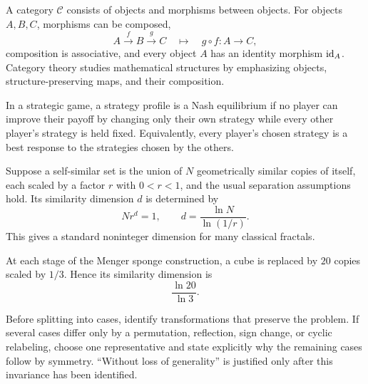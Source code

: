     \relatedbooks{}

    \begin{definition}[Category]
        A category $\mathcal{C}$ consists of objects and morphisms between
        objects. For objects $A,B,C$, morphisms can be composed,
        \[
            A\xrightarrow{f}B\xrightarrow{g}C
            \quad\longmapsto\quad
            g\circ f:A\to C,
        \]
        composition is associative, and every object $A$ has an identity
        morphism $\operatorname{id}_A$. Category theory studies mathematical structures by
        emphasizing objects, structure-preserving maps, and their composition.
    \end{definition}

    \begin{definition}
        In a strategic game, a strategy profile is a Nash equilibrium if no
        player can improve their payoff by changing only their own strategy
        while every other player's strategy is held fixed. Equivalently, every
        player's chosen strategy is a best response to the strategies chosen by
        the others.
    \end{definition}

    \begin{definition}
        Suppose a self-similar set is the union of $N$ geometrically similar
        copies of itself, each scaled by a factor $r$ with $0<r<1$, and the
        usual separation assumptions hold. Its similarity dimension $d$ is
        determined by
        \[
            Nr^d=1,
            \qquad
            d=\frac{\ln N}{\ln(1/r)}.
        \]
        This gives a standard noninteger dimension for many classical fractals.
    \end{definition}

    \begin{fact}
        At each stage of the Menger sponge construction, a cube is replaced by
        $20$ copies scaled by $1/3$. Hence its similarity dimension is
        \[
            \boxed{\frac{\ln20}{\ln3}}.
        \]
    \end{fact}

    \begin{strategy}
        Before splitting into cases, identify transformations that preserve the
        problem. If several cases differ only by a permutation, reflection,
        sign change, or cyclic relabeling, choose one representative and state
        explicitly why the remaining cases follow by symmetry. ``Without loss
        of generality'' is justified only after this invariance has been
        identified.
    \end{strategy}

